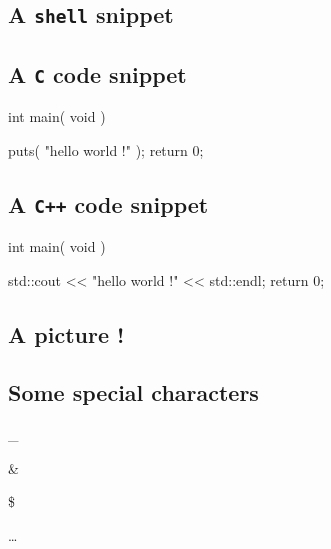 \documentclass{42-en}
\begin{document}
        \subsection{A \texttt{shell} snippet}




        \subsection{A \texttt{C} code snippet}

           \begin{42ccode}
int main( void ) {

    puts( "hello world !" );
    return 0;
}
\end{42ccode}


        \subsection{A \texttt{C++} code snippet}

            \begin{42cppcode}
int main( void ) {

    std::cout << "hello world !" << std::endl;
    return 0;
}
\end{42cppcode}


        \subsection{A picture !}

            \begin{figure}[H]
                \begin{center}
                \end{center}
            \end{figure}


        \newpage


        \subsection{Some special characters}

            \begin{description}\itemsep1pt
                \item [Underscore:] \_
                \item [Ampersand:] \&
                \item [Dollar:] \$
                \item [Elipsis:] \dots
            \end{description}
\end{document}
